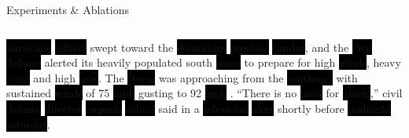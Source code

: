 \begin{frame}{Experiments \& Ablations}
\begin{columns}
\begin{column}{0.3\textwidth}
{{\begin{minipage}{\textwidth}
\tiny
 \colorbox{black}{hurricane} \colorbox{black}{gilbert} swept toward the \colorbox{black}{dominican} \colorbox{black}{republic} \colorbox{black}{sunday}, and the \colorbox{black}{civil} \colorbox{black}{defense} alerted its heavily populated south \colorbox{black}{coast} to prepare for high \colorbox{black}{winds}, heavy \colorbox{black}{rains} and high \colorbox{black}{seas}.
 The \colorbox{black}{storm} was approaching from the \colorbox{black}{southeast} with sustained \colorbox{black}{winds} of 75 \colorbox{black}{mph} gusting to 92 \colorbox{black}{mph} .
 ``There is no \colorbox{black}{need} for \colorbox{black}{alarm},'' civil \colorbox{black}{defense} \colorbox{black}{director} \colorbox{black}{eugenio} \colorbox{black}{cabral} said in a \colorbox{black}{television} \colorbox{black}{alert} shortly before \colorbox{black}{midnight} \colorbox{black}{saturday}.
\end{minipage}}}
\end{column}\end{columns}

\end{frame}
